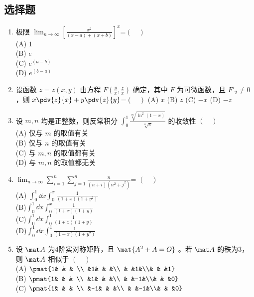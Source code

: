 
\subsection{选择题}
\begin{enumerate}
\item 极限  $\displaystyle \lim_{n\to\infty}[\frac{x^2}{(x-a)+(x+b)}]^x$=$(\quad )$\\
(A) $1$\\
(B) $e$\\
(C) $e^(a-b)$\\
(D) $e^(b-a)$
\item  设函数 $z=z(x,y)$ 由方程 $\displaystyle F(\frac{y}{x},\frac{z}{x})$ 确定，其中 $F$ 为可微函数，且 $F'_2 \neq0$ ，则  $\displaystyle x \pdv{z}{x}+y\pdv{z}{y}$=$(\quad )$
(A)  $x$
(B)  $z$
(C) $-x$
(D)  $-z$
\item 设 $m,n$ 均是正整数，则反常积分 $\displaystyle \int_0^1 \frac{\sqrt[m]{\ln^2(1-x)}}{\sqrt[n]{x}}$ 的收敛性 $(\quad )$\\
(A) 仅与 $m$ 的取值有关\\
(B) 仅与 $n$ 的取值有关\\
(C)  与 $m,n$ 的取值都有关\\
(D)  与 $m,n$ 的取值都无关
\item $\displaystyle \lim_{n\to\infty} \sum_{i=1}^n \sum_{j=1}^n \frac{n}{(n+i)(n^2+j^2)}$= $(\quad )$\\
(A) $\displaystyle \int_{0}^{1}\dd{x}\int_{0}^{x} \frac{1}{(1+x)(1+y^2)}$\\
(B)$\displaystyle \int_{0}^{1}\dd{x}\int_{0}^{x} \frac{1}{(1+x)(1+y)}$\\
(C)$\displaystyle \int_{0}^{1}\dd{x}\int_{0}^{1} \frac{1}{(1+x)(1+y)}$\\
(D)$\displaystyle \int_{0}^{1}\dd{x}\int_{0}^{1} \frac{1}{(1+x)(1+y^2)}$
\item 设 $\mat A$ 为4阶实对称矩阵，且 $\mat {A^2+A=O}$  。若 $\mat A$ 的秩为3，则 $\mat A$  相似于 $(\quad )$\\
(A) $\pmat{1& & &  \\ &1& & &\\ & &1&\\& & &1}$\\
(B) $\pmat{1& & &  \\ &1& & &\\ & &-1&\\& & &0}$\\
(C) $\pmat{1& & &  \\ &-1& & &\\ & &-1&\\& & &0}$\\

\end{enumerate}
